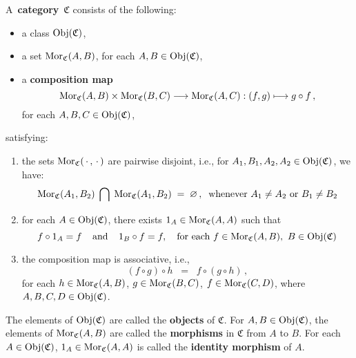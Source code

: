 \vskip 0.5cm
\begin{definition}[Category]
\mbox{}
\vskip 0.15cm
\noindent
A \,\textbf{category}\, $\mathfrak{C}$ consists of the following:
\begin{itemize}
\item
	a class $\textnormal{Obj}(\mathfrak{C})$,
\item
	a set $\textnormal{Mor}_{\mathfrak{C}}(A,B)$, for each $A, B \in \textnormal{Obj}(\mathfrak{C})$,
\item
	a \textbf{composition map}
	\begin{equation*}
	\textnormal{Mor}_{\mathfrak{C}}(A,B) \times \textnormal{Mor}_{\mathfrak{C}}(B,C) \longrightarrow \textnormal{Mor}_{\mathfrak{C}}(A,C) : (f,g) \longmapsto g \circ f\,,
	\end{equation*}
	for each $A, B, C \in \textnormal{Obj}(\mathfrak{C})$,
\end{itemize}
satisfying:
\begin{enumerate}
\item
	the sets $\textnormal{Mor}_{\mathfrak{C}}(\,\cdot\,,\,\cdot\,)$ are pairwise disjoint, i.e.,
	for $A_{1}, B_{1}, A_{2}, A_{2} \in \textnormal{Obj}(\mathfrak{C})$, we have:
	\begin{equation*}
	\textnormal{Mor}_{\mathfrak{C}}(A_{1},B_{2})\;\bigcap\;\textnormal{Mor}_{\mathfrak{C}}(A_{1},B_{2})
	\; = \;
		\varnothing\,,
	\;\;
	\textnormal{whenever $A_{1} \neq A_{2}$ or $B_{1} \neq B_{2}$}
	\end{equation*}
\item
	for each $A \in \textnormal{Obj}(\mathfrak{C})$, there exists $1_{A} \in \textnormal{Mor}_{\mathfrak{C}}(A,A)$ such that
	\begin{equation*}
	f \circ 1_{A} = f
	\;\;\;\;\textnormal{and}\;\;\;\;
	1_{B} \circ f = f,
	\quad
	\textnormal{for each $f \in \textnormal{Mor}_{\mathfrak{C}}(A,B)$, \,$B \in \textnormal{Obj}(\mathfrak{C})$}
	\end{equation*}
\item
	the composition map is associative, i.e.,
	\begin{equation*}
	(f \circ g) \circ h
	\;\; = \;\;
	f \circ (g \circ h)\,,
	\end{equation*}
	for each
	$h \in \textnormal{Mor}_{\mathfrak{C}}(A,B)$,
	$g \in \textnormal{Mor}_{\mathfrak{C}}(B,C)$,
	$f \in \textnormal{Mor}_{\mathfrak{C}}(C,D)$,\;
	where
	\,$A,B,C,D \in \textnormal{Obj}(\mathfrak{C})$.
\end{enumerate}
The elements of $\textnormal{Obj}(\mathfrak{C})$ are called the \textbf{objects} of $\mathfrak{C}$.
For $A, B \in \textnormal{Obj}(\mathfrak{C})$, the elements of  $\textnormal{Mor}_{\mathfrak{C}}(A,B)$
are called the \textbf{morphisms} in $\mathfrak{C}$ from $A$ to $B$.
For each $A \in \textnormal{Obj}(\mathfrak{C})$, $1_{A} \in \textnormal{Mor}_{\mathfrak{C}}(A,A)$ is called
the \textbf{identity morphism} of $A$.
\end{definition}

